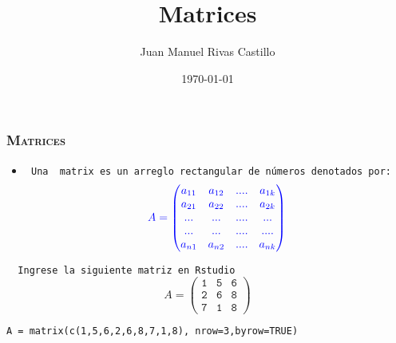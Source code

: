 \documentclass[16.5pt]{beamer}
\title{Matrices}
\author{Juan Manuel Rivas Castillo}
\institute{UNMSM}
\date{\today}
\begin{document}
\maketitle 

{
\begin{frame}
\frametitle{\textsc{\textbf{Matrices}}}
\hspace*{-5mm}
\vspace*{-5mm} 
\vspace{0.3cm}
\begin{itemize}
\item \texttt{ Una {\color{blue} matrix} es un arreglo rectangular de números denotados por:}
$$\color{blue} A= \mathtt{\begin{pmatrix} a_{11} &  a_{12}  &....&  a_{1k}  \\ 
a_{21} &  a_{22}  &....&  a_{2k} \\ 
... & ...&....& ... \\
... & ...&....& .... \\
a_{n1} &  a_{n2}  &....& a_{nk} \end{pmatrix}}$$

\end{itemize}
\texttt{  {\color{red} Ingrese la siguiente matriz en Rstudio} }
$$A= \mathtt{\begin{pmatrix} 1 & 5 & 6 \\ 2 & 6 & 8 \\ 7 & 1 & 8 \end{pmatrix}}$$

\begin{lstlisting}
A = matrix(c(1,5,6,2,6,8,7,1,8), nrow=3,byrow=TRUE)
\end{lstlisting}
\end{frame}


}
\end{document}
